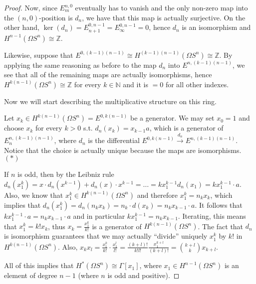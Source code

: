 \documentclass{article}
\newcommand{\numberset}{\mathbb}
\newcommand{\N}{\numberset{N}}
\newcommand{\Z}{\numberset{Z}}
\begin{document}
\begin{proof}
    Now, since $E^{n,0}_m$ eventually has to vanish and the only non-zero map
    into the $(n,0)$-position is $d_n$, we have that this map is actually
    surjective. On the other hand,
    $\ker(d_n)=E^{0,n-1}_{n+1}=E^{0,n-1}_\infty=0$, hence $d_n$ is an
    isomorphism and $H^{n-1}(\Omega S^n)\cong\Z$.

    Likewise, suppose that $E^{0,(k-1)(n-1)}\cong H^{(k-1)(n-1)}(\Omega S^n)
    \cong\Z$. By applying the same reasoning as before to the map $d_n$ into
    $E^{n,(k-1)(n-1)}$, we see that all of the remaining maps are actually
    isomorphisms, hence $H^{k(n-1)}(\Omega S^n)\cong\Z$ for every $k\in\N$ and
    it is $=0$ for all other indexes.

    Now we will start describing the multiplicative structure on this ring.

    Let $x_k\in H^{k(n-1)}(\Omega S^n)=E^{0,k(n-1)}$ be a generator. We may set
    $x_0=1$ and choose $x_k$ for every $k>0$ s.t. $d_n(x_k)=x_{k-1}a$, which is
    a generator of $E^{n,(k-1)(n-1)}_n$, where $d_n$ is the differential
    $E^{0,k(n-1)}\xrightarrow{d_n}E^{n,(k-1)(n-1)}$. Notice that the choice is
    actually unique because the maps are isomorphisms. $(*)$
    
    If $n$ is odd, then by the Leibniz rule $d_n(x_1^k)=x\cdot
    d_n(x^{k-1})+d_n(x)\cdot x^{k-1}=\ldots=kx_1^{k-1}d_n(x_1)=kx_1^{k-1}\cdot
    a$. Also, we know that $x_1^k\in H^{k(n-1)}(\Omega S^n)$ and therefore
    $x_1^k=n_kx_k$, which implies that $d_n(x_1^k)=d_n(n_kx_k)=n_k\cdot
    d(x_k)=n_kx_{k-1}\cdot a$. It follows that $kx_1^{k-1}\cdot a=n_kx_{k-1}
    \cdot a$ and in particular $kx_1^{k-1}=n_kx_{k-1}$. Iterating, this means
    that $x_1^k=k!x_k$, thus $x_k=\frac{x_1^k}{k!}$ is a generator of
    $H^{k(n-1)}(\Omega S^n)$. The fact that $d_n$ is isomorphism guarantees that
    we may actually ``divide'' uniquely $x_1^k$ by $k!$ in $H^{k(n-1)}(\Omega
    S^n)$. Also, $x_kx_l=\frac{x_1^k}{k!}\cdot\frac{x_1^l}{l!}=\frac{(k+l)!}
    {k!l!}\frac{x_1^{k+l}}{(k+l)!}=\binom{k+l}{k}x_{k+l}$.

    All of this implies that $H^*(\Omega S^n)\cong\Gamma[x_1]$, where $x_1\in
    H^{n-1}(\Omega S^n)$ is an element of degree $n-1$ (where $n$ is odd and
    positive).
\end{proof}
\end{document}
